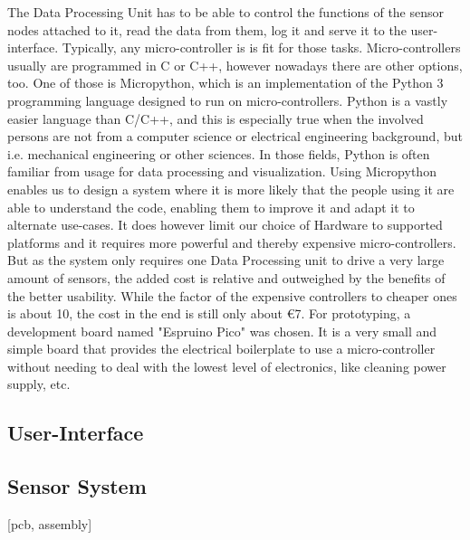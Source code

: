 The Data Processing Unit has to be able to control the functions of the sensor nodes attached to it, read the data from them, log it and serve it to the user-interface. Typically, any micro-controller is is fit for those tasks. Micro-controllers usually are programmed in C or C++, however nowadays there are other options, too. One of those is Micropython, which is an implementation of the Python 3 programming language designed to run on micro-controllers. Python is a vastly easier language than C/C++, and this is especially true when the involved persons are not from a computer science or electrical engineering background, but i.e. mechanical engineering or other sciences. In those fields, Python is often familiar from usage for data processing and visualization. Using Micropython enables us to design a system where it is more likely that the people using it are able to understand the code, enabling them to improve it and adapt it to alternate use-cases.
It does however limit our choice of Hardware to supported platforms and it requires more powerful and thereby expensive micro-controllers. But as the system only requires one Data Processing unit to drive a very large amount of sensors, the added cost is relative and outweighed by the benefits of the better usability. While the factor of the expensive controllers to cheaper ones is about 10, the cost in the end is still only about \euro{7}.
For prototyping, a development board named "Espruino Pico" was chosen. It is a very small and simple board that provides the electrical boilerplate to use a micro-controller without needing to deal with the lowest level of electronics, like cleaning power supply, etc.

\subsection{User-Interface}

\subsection{Sensor System}

[pcb, assembly]
